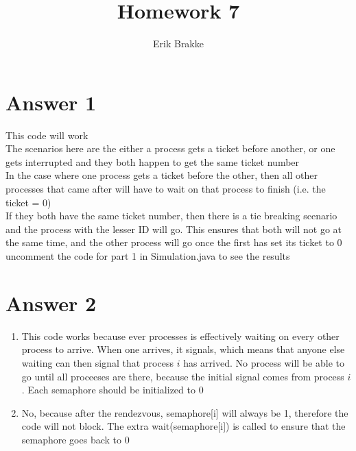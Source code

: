 \documentclass[11pt]{article}
\theoremstyle{definition}
\begin{document}
\title{Homework 7}
\author{Erik Brakke}
\maketitle

\thispagestyle{fancy}
 
 
\section*{Answer 1}
This code will work\\
The scenarios here are the either a process gets a ticket before another, or one gets interrupted and they both happen to get the same ticket number\\
In the case where one process gets a ticket before the other, then all other processes that came after will have to wait on that process to finish (i.e. the ticket = 0)\\
If they both have the same ticket number, then there is a tie breaking scenario and the process with the lesser ID will go.  This ensures that both will not go at the same time, and the other process will go once the first has set its ticket to 0\\
\newline
uncomment the code for part 1 in Simulation.java to see the results


\section*{Answer 2}
\begin{enumerate}
	\item This code works because ever processes is effectively waiting on every other process to arrive.  When one arrives, it signals, which means that anyone else waiting can then signal that process $i$ has arrived.  No process will be able to go until all proceeses are there, because the initial signal comes from process $i$.  Each semaphore should be initialized to 0\\

	\item No, because after the rendezvous, semaphore[i] will always be 1, therefore the code will not block.  The extra wait(semaphore[i]) is called to ensure that the semaphore goes back to 0

\end{enumerate}
\end{document}
